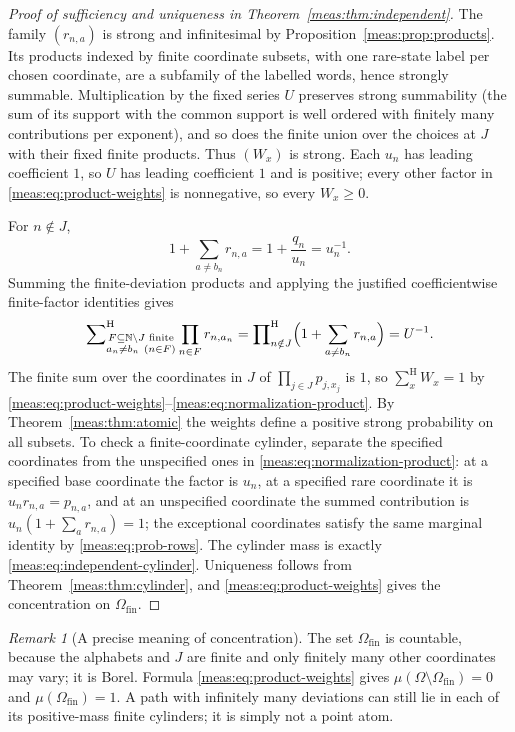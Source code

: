 \documentclass[11pt]{article}
\numberwithin{equation}{section}
\theoremstyle{definition}
\theoremstyle{remark}
\newtheorem{remark}[theorem]{Remark}
\newcommand{\N}{\mathbb N}
\newcommand{\hsum}{\mathop{\sum}\nolimits^{\mathrm H}}
\newcommand{\hprod}{\mathop{\prod}\nolimits^{\mathrm H}}
\begin{document}
\begin{proof}[Proof of sufficiency and uniqueness in
Theorem~\ref{meas:thm:independent}]
The family $(r_{n,a})$ is strong and infinitesimal by
Proposition~\ref{meas:prop:products}. Its products indexed by finite coordinate
subsets, with one rare-state label per chosen coordinate, are a subfamily of
the labelled words, hence strongly summable. Multiplication by the fixed
series $U$ preserves strong summability (the sum of its support with the
common support is well ordered with finitely many contributions per exponent),
and so does the finite union over the choices at $J$ with their fixed finite
products. Thus $(W_x)$ is strong. Each $u_n$ has leading coefficient $1$, so
$U$ has leading coefficient $1$ and is positive; every other factor in
\eqref{meas:eq:product-weights} is nonnegative, so every $W_x\ge0$.

For $n\notin J$,
\begin{equation}\label{meas:eq:one-plus-r}
 1+\sum_{a\ne b_n}r_{n,a}=1+\frac{q_n}{u_n}=u_n^{-1}.
\end{equation}
Summing the finite-deviation products and applying the justified
coefficientwise finite-factor identities gives
\begin{equation}\label{meas:eq:normalization-product}
 \hsum_{\substack{F\subseteq\N\setminus J\text{ finite}\\a_n\ne b_n\ (n\in F)}}
 \prod_{n\in F}r_{n,a_n}
 =\hprod_{n\notin J}\Bigl(1+\sum_{a\ne b_n}r_{n,a}\Bigr)=U^{-1}.
\end{equation}
The finite sum over the coordinates in $J$ of $\prod_{j\in J}p_{j,x_j}$ is $1$,
so $\hsum_xW_x=1$ by
\eqref{meas:eq:product-weights}--\eqref{meas:eq:normalization-product}. By
Theorem~\ref{meas:thm:atomic} the weights define a positive strong probability
on all subsets. To check a finite-coordinate cylinder, separate the specified
coordinates from the unspecified ones in \eqref{meas:eq:normalization-product}:
at a specified base coordinate the factor is $u_n$, at a specified rare
coordinate it is $u_nr_{n,a}=p_{n,a}$, and at an unspecified coordinate the
summed contribution is $u_n(1+\sum_ar_{n,a})=1$; the exceptional coordinates
satisfy the same marginal identity by \eqref{meas:eq:prob-rows}. The cylinder
mass is exactly \eqref{meas:eq:independent-cylinder}. Uniqueness follows from
Theorem~\ref{meas:thm:cylinder}, and \eqref{meas:eq:product-weights} gives the
concentration on $\Omega_{\mathrm{fin}}$.
\end{proof}

\begin{remark}[A precise meaning of concentration]
The set $\Omega_{\mathrm{fin}}$ is countable, because the alphabets and $J$ are
finite and only finitely many other coordinates may vary; it is Borel.
Formula \eqref{meas:eq:product-weights} gives
$\mu(\Omega\setminus\Omega_{\mathrm{fin}})=0$ and $\mu(\Omega_{\mathrm{fin}})=1$. A
path with infinitely many deviations can still lie in each of its
positive-mass finite cylinders; it is simply not a point atom.
\end{remark}
\end{document}
